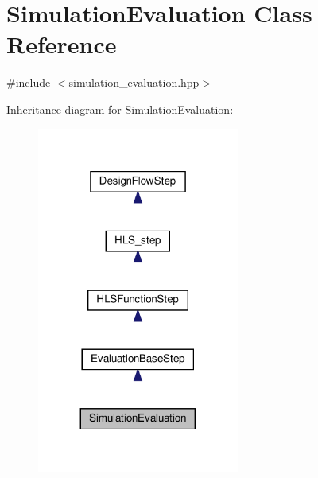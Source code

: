\hypertarget{classSimulationEvaluation}{}\section{Simulation\+Evaluation Class Reference}
\label{classSimulationEvaluation}


{\ttfamily \#include $<$simulation\+\_\+evaluation.\+hpp$>$}



Inheritance diagram for Simulation\+Evaluation\+:
\nopagebreak
\begin{figure}[H]
\begin{center}
\leavevmode
\includegraphics[width=188pt]{d1/d45/classSimulationEvaluation__inherit__graph}
\end{center}
\end{figure}


